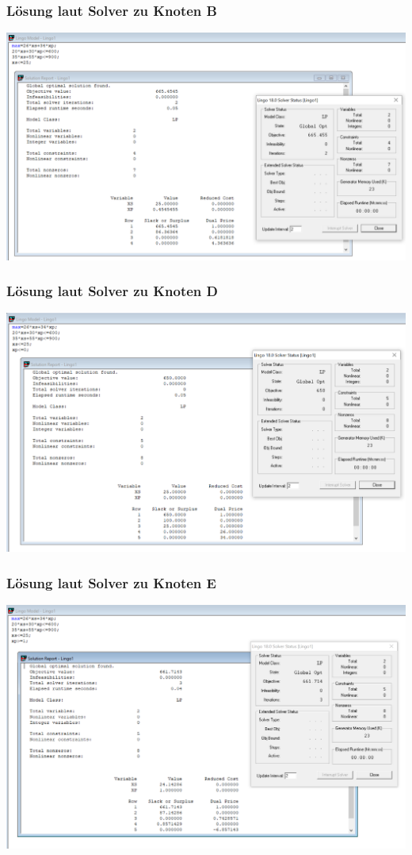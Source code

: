 \documentclass[a4paper,11pt]{article}
\begin{document}
\subsubsection*{Lösung laut Solver zu Knoten B}
\begin{centering}
	\includegraphics[width=0.65\linewidth]{src/blatt_5_aufgabe_2_teilaufgabe_b_knoten_b_loesung_solver.png}
\end{centering}

\subsubsection*{Lösung laut Solver zu Knoten D}
\begin{centering}
	\includegraphics[width=0.65\linewidth]{src/blatt_5_aufgabe_2_teilaufgabe_b_knoten_d_loesung_solver.png}
\end{centering}

\subsubsection*{Lösung laut Solver zu Knoten E}
\begin{centering}
	\includegraphics[width=0.65\linewidth]{src/blatt_5_aufgabe_2_teilaufgabe_b_knoten_e_loesung_solver.png}
\end{centering}
\end{document}
